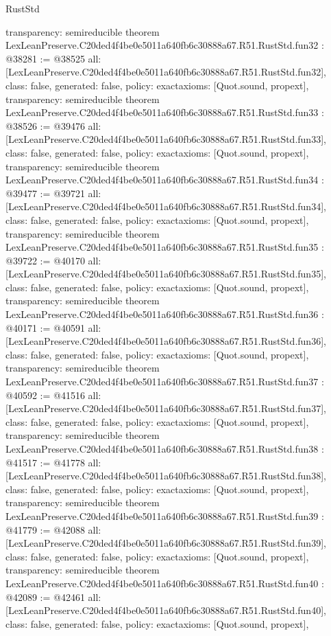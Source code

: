 \begin{lexlean}{RustStd}
\begin{coremodule}
{  transparency: semireducible
}
theorem LexLeanPreserve.C20ded4f4be0e5011a640fb6c30888a67.R51.RustStd.fun32 : @38281 := @38525 {
  all: [LexLeanPreserve.C20ded4f4be0e5011a640fb6c30888a67.R51.RustStd.fun32],
  class: false,
  generated: false,
  policy: exact{axioms: [Quot.sound, propext]},
  transparency: semireducible
}
theorem LexLeanPreserve.C20ded4f4be0e5011a640fb6c30888a67.R51.RustStd.fun33 : @38526 := @39476 {
  all: [LexLeanPreserve.C20ded4f4be0e5011a640fb6c30888a67.R51.RustStd.fun33],
  class: false,
  generated: false,
  policy: exact{axioms: [Quot.sound, propext]},
  transparency: semireducible
}
theorem LexLeanPreserve.C20ded4f4be0e5011a640fb6c30888a67.R51.RustStd.fun34 : @39477 := @39721 {
  all: [LexLeanPreserve.C20ded4f4be0e5011a640fb6c30888a67.R51.RustStd.fun34],
  class: false,
  generated: false,
  policy: exact{axioms: [Quot.sound, propext]},
  transparency: semireducible
}
theorem LexLeanPreserve.C20ded4f4be0e5011a640fb6c30888a67.R51.RustStd.fun35 : @39722 := @40170 {
  all: [LexLeanPreserve.C20ded4f4be0e5011a640fb6c30888a67.R51.RustStd.fun35],
  class: false,
  generated: false,
  policy: exact{axioms: [Quot.sound, propext]},
  transparency: semireducible
}
theorem LexLeanPreserve.C20ded4f4be0e5011a640fb6c30888a67.R51.RustStd.fun36 : @40171 := @40591 {
  all: [LexLeanPreserve.C20ded4f4be0e5011a640fb6c30888a67.R51.RustStd.fun36],
  class: false,
  generated: false,
  policy: exact{axioms: [Quot.sound, propext]},
  transparency: semireducible
}
theorem LexLeanPreserve.C20ded4f4be0e5011a640fb6c30888a67.R51.RustStd.fun37 : @40592 := @41516 {
  all: [LexLeanPreserve.C20ded4f4be0e5011a640fb6c30888a67.R51.RustStd.fun37],
  class: false,
  generated: false,
  policy: exact{axioms: [Quot.sound, propext]},
  transparency: semireducible
}
theorem LexLeanPreserve.C20ded4f4be0e5011a640fb6c30888a67.R51.RustStd.fun38 : @41517 := @41778 {
  all: [LexLeanPreserve.C20ded4f4be0e5011a640fb6c30888a67.R51.RustStd.fun38],
  class: false,
  generated: false,
  policy: exact{axioms: [Quot.sound, propext]},
  transparency: semireducible
}
theorem LexLeanPreserve.C20ded4f4be0e5011a640fb6c30888a67.R51.RustStd.fun39 : @41779 := @42088 {
  all: [LexLeanPreserve.C20ded4f4be0e5011a640fb6c30888a67.R51.RustStd.fun39],
  class: false,
  generated: false,
  policy: exact{axioms: [Quot.sound, propext]},
  transparency: semireducible
}
theorem LexLeanPreserve.C20ded4f4be0e5011a640fb6c30888a67.R51.RustStd.fun40 : @42089 := @42461 {
  all: [LexLeanPreserve.C20ded4f4be0e5011a640fb6c30888a67.R51.RustStd.fun40],
  class: false,
  generated: false,
  policy: exact{axioms: [Quot.sound, propext]},
}
\end{coremodule}
\end{lexlean}

